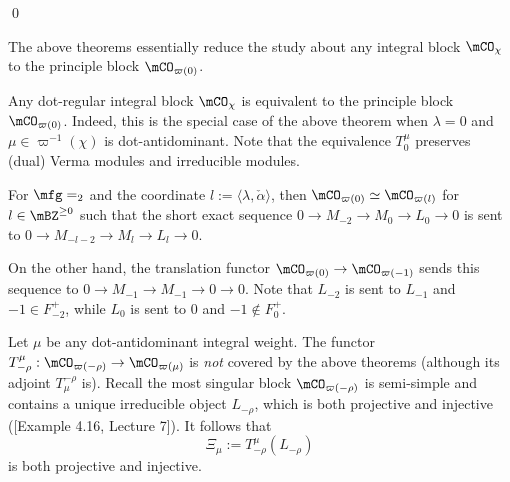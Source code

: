 	\qed


	\begin{rem}
		The above theorems essentially reduce the study about any integral block $\mCO_\chi$ to the principle block $\mCO_{\varpi(0)}$.
	\end{rem}

	\begin{exam}
		Any dot-regular integral block $\mCO_\chi$ is equivalent to the principle block $\mCO_{\varpi(0)}$. Indeed, this is the special case of the above theorem when $\lambda=0$ and $\mu\in \varpi^{-1}(\chi)$ is dot-antidominant. Note that the equivalence $T_0^\mu$ preserves (dual) Verma modules and irreducible modules. 
	\end{exam}

	\begin{exam}
		For $\mfg=\sl_2$ and the coordinate $l:=\langle \lambda, \check \alpha \rangle$, then $\mCO_{\varpi(0)} \simeq \mCO_{\varpi(l)}$ for $l\in \mBZ^{\ge 0}$ such that the short exact sequence $0\to M_{-2} \to M_0 \to L_0 \to 0$ is sent to $0\to M_{-l-2} \to M_l \to L_l \to 0$. 

		On the other hand, the translation functor $\mCO_{\varpi(0)} \to \mCO_{\varpi(-1)}$ sends this sequence to $0 \to M_{-1} \to M_{-1} \to 0 \to 0$. Note that $L_{-2}$ is sent to $L_{-1}$ and $-1 \in F_{-2}^+$, while $L_{0}$ is sent to $0$ and $-1 \notin F_{0}^+$.
	\end{exam}


	\begin{constr}
		Let $\mu$ be any dot-antidominant integral weight. The functor $T_{-\rho}^\mu:\mCO_{\varpi(-\rho)} \to \mCO_{\varpi(\mu)}$ is \emph{not} covered by the above theorems (although its adjoint $T_\mu^{-\rho}$ is). Recall the most singular block $\mCO_{\varpi(-\rho)}$ is semi-simple and contains a unique irreducible object $L_{-\rho}$, which is both projective and injective ([Example 4.16, Lecture 7]). It follows that 
		\[
			\Xi_{\mu}:= T_{-\rho}^\mu(L_{-\rho})
		\]
		is both projective and injective.
	\end{constr}


